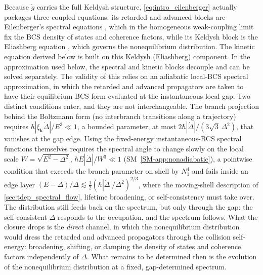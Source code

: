 \documentclass[
  aps,
  prb,
  preprint,
  superscriptaddress,
  longbibliography,
  nofootinbib
]{revtex4-2}
\newcommand{\bk}{\mathbf{k}}
\newcommand{\DOS}{N_1}
\newcommand{\checkg}{\check{g}}
\begin{document}
Because \(\checkg\) carries the full Keldysh structure,
\cref{eq:intro_eilenberger} actually packages three coupled equations:
its retarded and advanced blocks are Eilenberger's spectral equations
\cite{eilenberger1968}, which in the homogeneous weak-coupling limit fix
the BCS density of states and coherence factors, while its Keldysh block
is the Eliashberg equation \cite{eliashberg1972,larkin1986}, which
governs the nonequilibrium distribution. The kinetic equation derived
below is built on this Keldysh (Eliashberg) component. In the
approximation used below, the spectral and kinetic blocks decouple and
can be solved separately.
The validity of this relies on an adiabatic local-BCS
spectral approximation, in which the retarded and advanced propagators are
taken to have their equilibrium BCS form evaluated at the instantaneous
local gap. Two distinct conditions enter, and they are not
interchangeable. The branch projection behind the Boltzmann form
(no interbranch transitions along a trajectory) requires
\(\hbar|\xi_{\bk}\dot\Delta|/E^3\ll1\), a bounded parameter, at most
\(2\hbar|\dot\Delta|/(3\sqrt3\,\Delta^2)\), that vanishes at the gap
edge. Using the fixed-energy instantaneous-BCS spectral functions
themselves requires the spectral angle to change slowly on the local
scale \(W=\sqrt{E^2-\Delta^2}\), \(\hbar E|\dot\Delta|/W^3\ll1\)
(SM~\cref{SM-app:nonadiabatic}), a pointwise condition that exceeds the
branch parameter on shell by \(\DOS^4\) and fails inside an edge layer
\((E-\Delta)/\Delta\lesssim\tfrac12(\hbar|\dot\Delta|/\Delta^2)^{2/3}\),
where the moving-shell description of \cref{sec:tdep_spectral_flow},
lifetime broadening, or self-consistency must take over. The distribution still feeds back on the spectrum, but only
through the gap: the self-consistent \(\Delta\) responds to the
occupation, and the spectrum follows. What the closure drops is the
\emph{direct} channel, in which the nonequilibrium distribution would
dress the retarded and advanced propagators through the collision
self-energy: broadening, shifting, or damping the density of states
and coherence factors independently of \(\Delta\). What remains to be determined then is the evolution of the nonequilibrium distribution at a fixed,
gap-determined spectrum.
\end{document}
